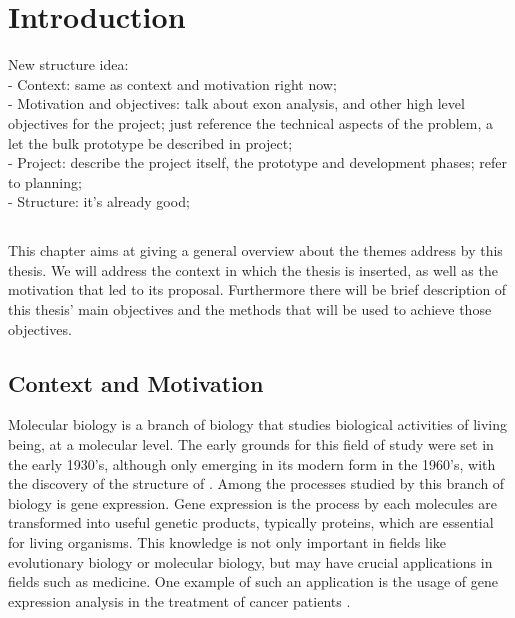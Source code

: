 \chapter{Introduction} \label{chap:intro}

New structure idea:\\
  - Context: same as context and motivation right now;\\
  - Motivation and objectives: talk about exon analysis, and other high level
    objectives for the project; just reference the technical aspects of the
    problem, a let the bulk prototype be described in project;\\
  - Project: describe the project itself, the prototype and development phases;
    refer to planning;\\
  - Structure: it's already good;\\

\section*{}

This chapter aims at giving a general overview about the themes address by this
thesis. We will address the context in which the thesis is inserted, as well as
the motivation that led to its proposal. Furthermore there will be brief
description of this thesis' main objectives and the methods that will be used to
achieve those objectives.

\section{Context and Motivation} \label{sec:context}

Molecular biology is a branch of biology that studies biological activities of
living being, at a molecular level. The early grounds for this field of study
were set in the early 1930's, although only emerging in its modern form in the
1960's, with the discovery of the structure of \dna. Among the processes studied
by this branch of biology is gene expression. Gene expression is the process by
each \dna{} molecules are transformed into useful genetic products, typically
proteins, which are essential for living organisms. This knowledge is not only
important in fields like evolutionary biology or molecular biology, but may have
crucial applications in fields such as medicine. One example of such an
application is the usage of gene expression analysis in the treatment of cancer
patients \cite{Pusztai01062003}.

